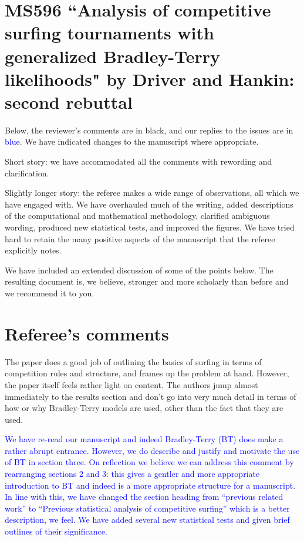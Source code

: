 \documentclass[12pt]{article}
\begin{document}
\section*{MS596 ``Analysis of competitive surfing tournaments
  with generalized Bradley-Terry likelihoods" by Driver and
  Hankin: second rebuttal}

Below, the reviewer's comments are in black, and our replies to the
issues are in \textcolor{blue}{blue}.  We have indicated changes to
the manuscript where appropriate.  

Short story: we have accommodated all the comments with rewording and
clarification.  

Slightly longer story: the referee makes a wide range of observations,
all which we have engaged with.  We have overhauled much of the
writing, added descriptions of the computational and mathematical
methodology, clarified ambiguous wording, produced new statistical
tests, and improved the figures.  We have tried hard to retain the
many positive aspects of the manuscript that the referee explicitly
notes.

We have included an extended discussion of some of the points below.
The resulting document is, we believe, stronger and more scholarly
than before and we recommend it to you.


\section*{Referee's comments}

The paper does a good job of outlining the basics of surfing in terms
of competition rules and structure, and frames up the problem at
hand.  However, the paper itself feels rather light on content.  The
authors jump almost immediately to the results section and don't go
into very much detail in terms of how or why Bradley-Terry models are
used, other than the fact that they are used.

\textcolor{blue}{We have re-read our manuscript and indeed
  Bradley-Terry (BT) does make a rather abrupt entrance.  However, we
  do describe and justify and motivate the use of BT in section three.
  On reflection we believe we can address this comment by rearranging
  sections 2 and 3: this gives a gentler and more appropriate
  introduction to BT and indeed is a more appropriate structure for a
  manuscript.  In line with this, we have changed the section heading
  from ``previous related work'' to ``Previous statistical analysis of
  competitive surfing'' which is a better description, we feel.  We
  have added several new statistical tests and given brief outlines of
  their significance.}
\end{document}
